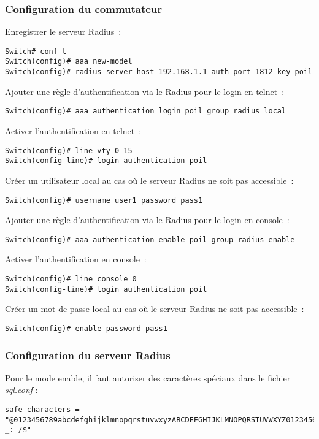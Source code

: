 \subsubsection{Configuration du commutateur}

Enregistrer le serveur Radius~:
\begin{verbatim}
Switch# conf t
Switch(config)# aaa new-model
Switch(config)# radius-server host 192.168.1.1 auth-port 1812 key poil
\end{verbatim}

Ajouter une règle d'authentification via le Radius pour le login en telnet~:
\begin{verbatim}
Switch(config)# aaa authentication login poil group radius local
\end{verbatim}

Activer l'authentification en telnet~:
\begin{verbatim}
Switch(config)# line vty 0 15
Switch(config-line)# login authentication poil
\end{verbatim}

Créer un utilisateur local au cas où le serveur Radius ne soit pas accessible~:
\begin{verbatim}
Switch(config)# username user1 password pass1
\end{verbatim}

Ajouter une règle d'authentification via le Radius pour le login en console~:
\begin{verbatim}
Switch(config)# aaa authentication enable poil group radius enable
\end{verbatim}

Activer l'authentification en console~:
\begin{verbatim}
Switch(config)# line console 0
Switch(config-line)# login authentication poil
\end{verbatim}

Créer un mot de passe local au cas où le serveur Radius ne soit pas accessible~:
\begin{verbatim}
Switch(config)# enable password pass1
\end{verbatim}

\subsubsection{Configuration du serveur Radius}

Pour le mode enable, il faut autoriser des caractères spéciaux dans le fichier \textit{sql.conf} :
\begin{verbatim}
safe-characters = "@0123456789abcdefghijklmnopqrstuvwxyzABCDEFGHIJKLMNOPQRSTUVWXYZ0123456789.-_: /$"
\end{verbatim}

